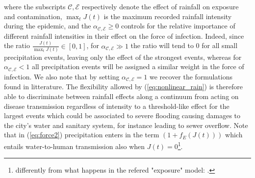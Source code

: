 where the subscripts $\mathcal{C,E}$ respectively denote the effect of rainfall on exposure and contamination, $\max_t J(t)$ is the maximum recorded rainfall intensity during the epidemic, and the $\alpha_{\mathcal{C,E}}\ge0$ controls for the relative importance of different rainfall intensities in their effect on the force of infection. Indeed, since the ratio $\frac{J(t)}{\max_t J(t)} \in [0,1]$, for $\alpha_{\mathcal{C,E}} \gg 1$ the ratio will tend to 0 for all small precipitation events, leaving only the effect of the strongest events, whereas for $\alpha_{\mathcal{C,E}} < 1$ all precipitation events will be assigned a similar weight in the force of infection. We also note that by setting $\alpha_{\mathcal{C,E}} = 1$ we recover the formulations found in litterature. The flexibility allowed by (\ref{eq:nonlinear_rain}) is therefore able to discriminate between rainfall effects along a continuum from acting on disease transmission regardless of intensity to a threshold-like effect for the largest events which could be associated to severe flooding causing damages to the city's water and sanitary system, for instance leading to sewer overflow.
Note that in (\ref{eq:force2}) precipitation enters in the term $\left(1+f_E \left(J(t)\right)\right)$ which entails water-to-human transmission also when $J(t)=0$\footnote{differently from what happens in the refered "exposure" model: .}.

